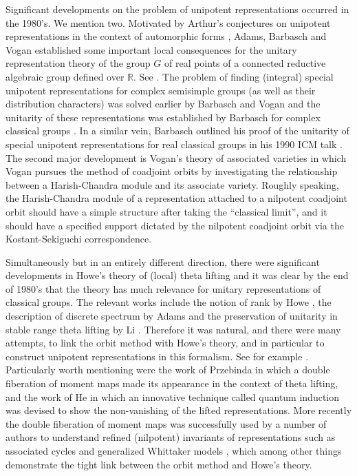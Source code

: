 \documentclass[12pt,a4paper]{amsart}
\newcommand{\R}{\mathbb R}
\numberwithin{equation}{section}
\theoremstyle{remark}
\begin{document}
Significant developments on the problem of unipotent representations occurred in the 1980's. We mention two. Motivated by Arthur's conjectures on unipotent representations in the context of automorphic forms \cite{ArPro,ArUni}, Adams, Barbasch and Vogan established some important local consequences for the unitary representation theory of the group $G$ of real points of a connected reductive algebraic group defined over $\R$. See \cite{ABV}. The problem of finding (integral) special unipotent representations for complex semisimple groups (as well as their distribution characters) was solved earlier by Barbasch and Vogan \cite{BVUni} and the unitarity of these representations was established by Barbasch for complex classical groups \cite{B.Class}. In a similar vein, Barbasch outlined his proof of the unitarity of special unipotent representations for real classical groups in his 1990 ICM talk \cite{B.Uni}. The second major development is Vogan's theory of associated varieties \cite{Vo89} in which Vogan pursues the method of coadjoint orbits by investigating the relationship between a Harish-Chandra module and its associate variety. Roughly speaking, the Harish-Chandra module of a representation attached to a nilpotent coadjoint orbit should have a simple structure after taking the ``classical limit'', and it should have a specified support dictated by the nilpotent coadjoint orbit via the Kostant-Sekiguchi correspondence.

Simultaneously but in an entirely different direction,  there were significant developments in Howe's theory of (local) theta lifting and it was clear by the end of 1980's that the theory has much relevance for unitary representations of classical groups. The relevant works include the notion of rank by Howe \cite{HoweRank}, the description of discrete spectrum by Adams \cite{Ad83} and the preservation of unitarity in stable range theta lifting by Li \cite{Li89}. Therefore it was natural, and there were many attempts, to link the orbit method with Howe's theory, and in particular to construct unipotent representations in this formalism. See for example \cite{Sa,Pz,HZ,HL,Br,He,Tr,PT,B17}. Particularly worth mentioning were the work of Przebinda \cite{Pz} in which a double fiberation of moment maps made its appearance in the context of theta lifting, and the work of He \cite{He} in which an innovative technique called quantum induction was devised to show the non-vanishing of the lifted representations. More recently the double fiberation of moment maps was successfully used by a number of authors to understand refined (nilpotent) invariants of representations such as associated cycles and generalized Whittaker models \cite{NOTYK, NZ, GZ, LM}, which among other things demonstrate the tight link between the orbit method and Howe's theory.
\end{document}
